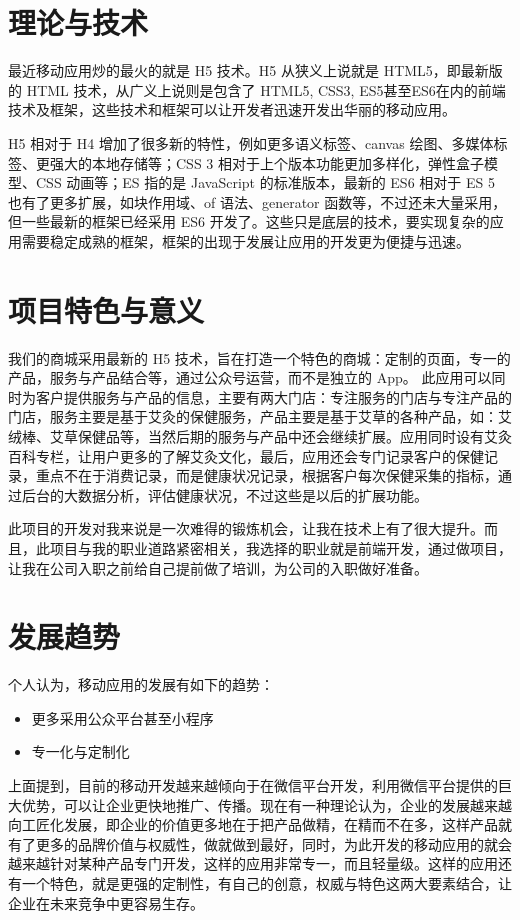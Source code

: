     \section{理论与技术}
      \label{sec:理论与技术}
        最近移动应用炒的最火的就是 H5 技术。H5 从狭义上说就是 HTML5，即最新版的 HTML 技术，从广义上说则是包含了 HTML5, CSS3, ES5甚至ES6在内的前端技术及框架，这些技术和框架可以让开发者迅速开发出华丽的移动应用。
        \par
        H5 相对于 H4 增加了很多新的特性，例如更多语义标签、canvas 绘图、多媒体标签、更强大的本地存储等；CSS 3 相对于上个版本功能更加多样化，弹性盒子模型、CSS 动画等；ES 指的是 JavaScript 的标准版本，最新的 ES6 相对于 ES 5 也有了更多扩展，如块作用域、of 语法、generator 函数等，不过还未大量采用，但一些最新的框架已经采用 ES6 开发了。这些只是底层的技术，要实现复杂的应用需要稳定成熟的框架，框架的出现于发展让应用的开发更为便捷与迅速。

    \section{项目特色与意义}
      \label{sec:项目特色与意义}
        我们的商城采用最新的 H5 技术，旨在打造一个特色的商城：定制的页面，专一的产品，服务与产品结合等，通过公众号运营，而不是独立的 App。
        此应用可以同时为客户提供服务与产品的信息，主要有两大门店：专注服务的门店与专注产品的门店，服务主要是基于艾灸的保健服务，产品主要是基于艾草的各种产品，如：艾绒棒、艾草保健品等，当然后期的服务与产品中还会继续扩展。应用同时设有艾灸百科专栏，让用户更多的了解艾灸文化，最后，应用还会专门记录客户的保健记录，重点不在于消费记录，而是健康状况记录，根据客户每次保健采集的指标，通过后台的大数据分析，评估健康状况，不过这些是以后的扩展功能。
        \par
        此项目的开发对我来说是一次难得的锻炼机会，让我在技术上有了很大提升。而且，此项目与我的职业道路紧密相关，我选择的职业就是前端开发，通过做项目，让我在公司入职之前给自己提前做了培训，为公司的入职做好准备。

    \section{发展趋势}
      \label{sec:发展趋势}
        个人认为，移动应用的发展有如下的趋势：
        \begin{itemize}
          \item 更多采用公众平台甚至小程序
          \item 专一化与定制化
        \end{itemize}
        \par
        上面提到，目前的移动开发越来越倾向于在微信平台开发，利用微信平台提供的巨大优势，可以让企业更快地推广、传播。现在有一种理论认为，企业的发展越来越向工匠化发展，即企业的价值更多地在于把产品做精，在精而不在多，这样产品就有了更多的品牌价值与权威性，做就做到最好，同时，为此开发的移动应用的就会越来越针对某种产品专门开发，这样的应用非常专一，而且轻量级。这样的应用还有一个特色，就是更强的定制性，有自己的创意，权威与特色这两大要素结合，让企业在未来竞争中更容易生存。



